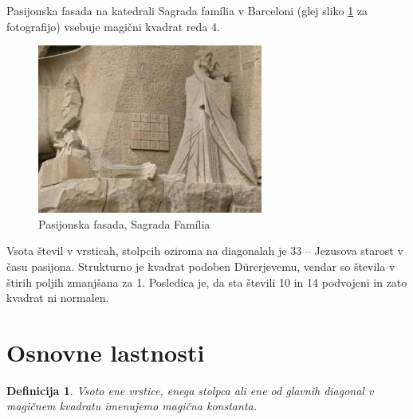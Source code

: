 \documentclass[a4paper,12pt]{article}
\newtheorem{Definicija}{Definicija}
\begin{document}
Pasijonska fasada na katedrali Sagrada família v Barceloni
(glej sliko \ref{fig:sagrada} za fotografijo) vsebuje magični kvadrat reda 4.


\begin{figure}
   \caption{Pasijonska fasada, Sagrada Família}
   \label{fig:sagrada}
   \begin{center}
      \includegraphics[scale=0.3]{sagrada.png}
   \end{center}
\end{figure} 

Vsota števil v vrsticah, stolpcih oziroma na diagonalah je 33 -- Jezusova starost
v času pasijona. Strukturno je kvadrat podoben Dürerjevemu, vendar so števila
v štirih poljih zmanjšana za 1. Posledica je, da sta števili 10 in 14 podvojeni
in zato kvadrat ni normalen.
%


\section{Osnovne lastnosti}


\begin{Definicija}
         Vsoto ene vrstice, enega stolpca ali ene od glavnih diagonal
         v magičnem kvadratu imenujemo \emph{magična konstanta}.
\end{Definicija}
\end{document}
